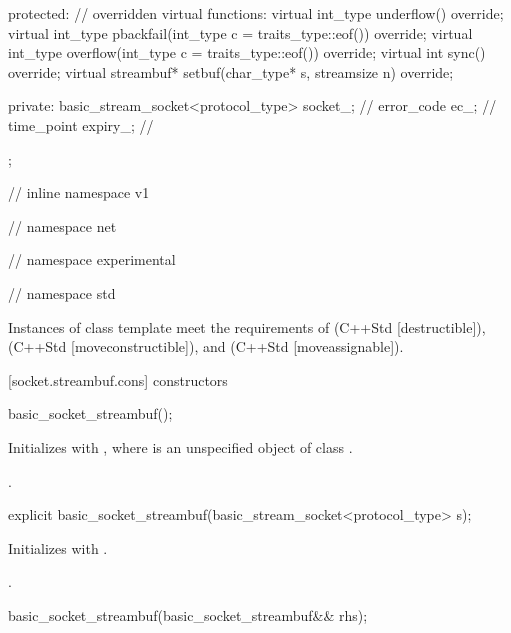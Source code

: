 \begin{codeblock}
{{{{{  protected:
    // overridden virtual functions:
    virtual int_type underflow() override;
    virtual int_type pbackfail(int_type c = traits_type::eof()) override;
    virtual int_type overflow(int_type c = traits_type::eof()) override;
    virtual int sync() override;
    virtual streambuf* setbuf(char_type* s, streamsize n) override;

  private:
    basic_stream_socket<protocol_type> socket_; // \expos
    error_code ec_; // \expos
    time_point expiry_; // \expos
  };

} // inline namespace v1
} // namespace net
} // namespace experimental
} // namespace std
\end{codeblock}

\pnum
Instances of class template  meet the requirements of  (C++Std [destructible]),  (C++Std [moveconstructible]), and  (C++Std [moveassignable]).


[socket.streambuf.cons]{ constructors}

\begin{itemdecl}
basic_socket_streambuf();
\end{itemdecl}

\begin{itemdescr}
\pnum
\effects Initializes  with , where  is an unspecified object of class .

\pnum
\postconditions {}.
\end{itemdescr}

\begin{itemdecl}
explicit basic_socket_streambuf(basic_stream_socket<protocol_type> s);
\end{itemdecl}

\begin{itemdescr}
\pnum
\effects Initializes  with .

\pnum
\postconditions {}.
\end{itemdescr}

\begin{itemdecl}
basic_socket_streambuf(basic_socket_streambuf&& rhs);
\end{itemdecl}

